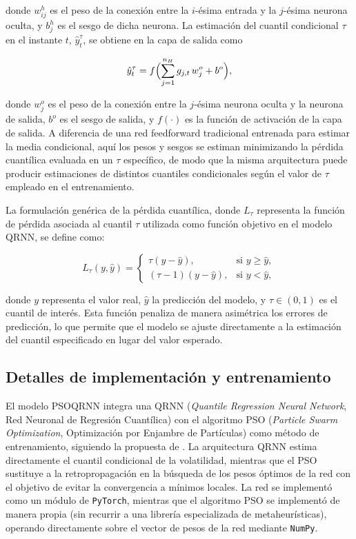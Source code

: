 \documentclass[12pt]{paper}
\begin{document}
donde $w_{ij}^{h}$ es el peso de la conexión entre la $i$-ésima entrada y la $j$-ésima neurona oculta, y $b_j^{h}$ es el sesgo de dicha neurona. La estimación del cuantil condicional $\tau$ en el instante $t$, $\hat{y}_t^{\tau}$, se obtiene en la capa de salida como

\begin{equation}
    \hat{y}_t^{\tau} = f\Bigl(\sum_{j=1}^{n_H} g_{j,t}\,w_j^{o} + b^{o}\Bigr),
\end{equation}

donde $w_j^{o}$ es el peso de la conexión entre la $j$-ésima neurona oculta y la neurona de salida, $b^{o}$ es el sesgo de salida, y $f(\cdot)$ es la función de activación de la capa de salida. A diferencia de una red feedforward tradicional entrenada para estimar la media condicional, aquí los pesos y sesgos se estiman minimizando la pérdida cuantílica evaluada en un $\tau$ específico, de modo que la misma arquitectura puede producir estimaciones de distintos cuantiles condicionales según el valor de $\tau$ empleado en el entrenamiento.

La formulación genérica de la pérdida cuantílica, donde $L_{\tau}$ representa la función de pérdida asociada al cuantil $\tau$ utilizada como función objetivo en el modelo QRNN, se define como:

\begin{equation}
L_{\tau}(y, \hat{y}) =
\begin{cases}
\tau (y - \hat{y}), & \text{si } y \geq \hat{y}, \\
(\tau - 1)(y - \hat{y}), & \text{si } y < \hat{y},
\end{cases}
\end{equation}

donde $y$ representa el valor real, $\hat{y}$ la predicción del modelo, y $\tau \in (0,1)$ es el cuantil de interés. Esta función penaliza de manera asimétrica los errores de predicción, lo que permite que el modelo se ajuste directamente a la estimación del cuantil especificado en lugar del valor esperado.

\subsection{Detalles de implementación y entrenamiento}
\label{sec:psoqrnn-impl}

El modelo PSOQRNN integra una QRNN (\textit{Quantile Regression Neural Network}, Red Neuronal de Regresión Cuantílica) \citep{taylor2000qrnn} con el algoritmo PSO (\textit{Particle Swarm Optimization}, Optimización por Enjambre de Partículas) \citep{kennedy1995} como método de entrenamiento, siguiendo la propuesta de \citet{pradeepkumar2017forecasting}. La arquitectura QRNN estima directamente el cuantil condicional de la volatilidad, mientras que el PSO sustituye a la retropropagación en la búsqueda de los pesos óptimos de la red con el objetivo de evitar la convergencia a mínimos locales. La red se implementó como un módulo de \texttt{PyTorch}, mientras que el algoritmo PSO se implementó de manera propia (sin recurrir a una librería especializada de metaheurísticas), operando directamente sobre el vector de pesos de la red mediante \texttt{NumPy}.
\end{document}
